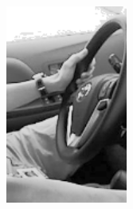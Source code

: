 \documentclass{beamer}
\begin{document}
\begin{frame}
\begin{columns}
\begin{column}{0.5\textwidth}
\begin{center}
    				\includegraphics[width=0.3\textwidth]{steering_wheel4}
    				
    			\end{center}
    		\end{column}
    	\end{columns}
    	
    \end{frame}
    
\end{document}
